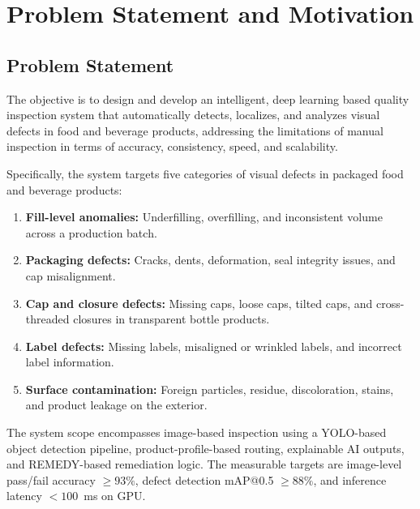 \documentclass{ieeeaccess}
\begin{document}
\section{Problem Statement and Motivation}
\label{sec:problem}

\subsection{Problem Statement}
The objective is to design and develop an intelligent, deep learning based quality inspection system that automatically detects, localizes, and analyzes visual defects in food and beverage products, addressing the limitations of manual inspection in terms of accuracy, consistency, speed, and scalability.

Specifically, the system targets five categories of visual defects in packaged food and beverage products:
\begin{enumerate}
    \item \textbf{Fill-level anomalies:} Underfilling, overfilling, and inconsistent volume across a production batch.
    \item \textbf{Packaging defects:} Cracks, dents, deformation, seal integrity issues, and cap misalignment.
    \item \textbf{Cap and closure defects:} Missing caps, loose caps, tilted caps, and cross-threaded closures in transparent bottle products.
    \item \textbf{Label defects:} Missing labels, misaligned or wrinkled labels, and incorrect label information.
    \item \textbf{Surface contamination:} Foreign particles, residue, discoloration, stains, and product leakage on the exterior.
\end{enumerate}

The system scope encompasses image-based inspection using a YOLO-based object detection pipeline, product-profile-based routing, explainable AI outputs, and REMEDY-based remediation logic. The measurable targets are image-level pass/fail accuracy $\geq 93\%$, defect detection mAP@0.5 $\geq 88\%$, and inference latency $< 100$~ms on GPU.
\end{document}
